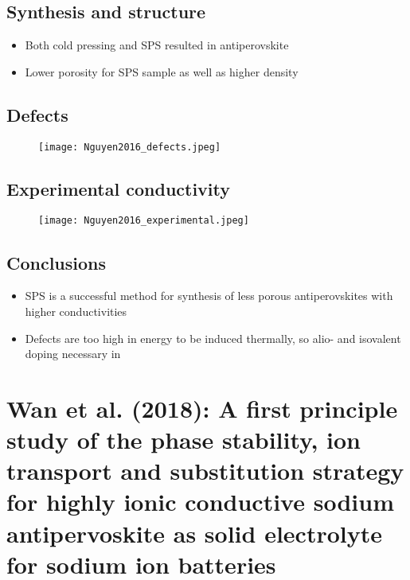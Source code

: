 \documentclass[10pt,a4paper, titlepage]{article}
\begin{document}
\subsection{Synthesis and structure}

\begin{itemize}
  \item Both cold pressing and SPS resulted in antiperovskite 
  \item Lower porosity for SPS sample as well as higher density
\end{itemize}

\subsection{Defects}

\begin{figure}[H]
\centering
\texttt{[image: Nguyen2016\_defects.jpeg]}
\end{figure}

\subsection{Experimental conductivity}

\begin{figure}[H]
\centering
\texttt{[image: Nguyen2016\_experimental.jpeg]}
\end{figure}

\subsection{Conclusions}

\begin{itemize}
  \item SPS is a successful method for synthesis of less porous antiperovskites with higher conductivities
  \item Defects are too high in energy to be induced thermally, so alio- and isovalent doping necessary in 
\end{itemize}

\section{Wan et al. (2018): A first principle study of the phase stability, ion transport and substitution strategy for highly ionic conductive sodium antipervoskite as solid electrolyte for sodium ion batteries}
\end{document}
